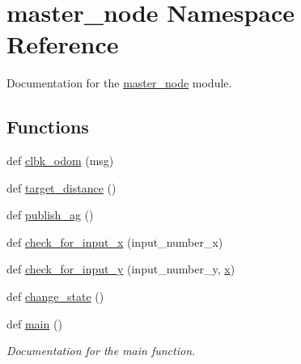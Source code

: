 \hypertarget{namespacemaster__node}{}\section{master\+\_\+node Namespace Reference}
\label{namespacemaster__node}


Documentation for the \hyperlink{namespacemaster__node}{master\+\_\+node} module.  


\subsection*{Functions}
\begin{DoxyCompactItemize}
\item 
def \hyperlink{namespacemaster__node_a5b919927efce47b56b923447a6da9fab}{clbk\+\_\+odom} (msg)
\item 
def \hyperlink{namespacemaster__node_a3488ca68ed6c44dc10a924d5cc2c8bb8}{target\+\_\+distance} ()
\item 
def \hyperlink{namespacemaster__node_a9494767e20dc61a10e137256d2b67fe9}{publish\+\_\+ag} ()
\item 
def \hyperlink{namespacemaster__node_a4fd98279c67cc84ca77711ee2941d683}{check\+\_\+for\+\_\+input\+\_\+x} (input\+\_\+number\+\_\+x)
\item 
def \hyperlink{namespacemaster__node_a4258710deedf0cd5532deab6761cbaa2}{check\+\_\+for\+\_\+input\+\_\+y} (input\+\_\+number\+\_\+y, \hyperlink{namespacemaster__node_a9ea1782ac4a7c8c92e8555fa503ac755}{x})
\item 
def \hyperlink{namespacemaster__node_a5bfa19ba31fffb842b2a34586ca8afff}{change\+\_\+state} ()
\item 
def \hyperlink{namespacemaster__node_a2ca55226f7fa9d0a646050f441478702}{main} ()
\begin{DoxyCompactList}\small\item\em Documentation for the main function. \end{DoxyCompactList}\end{DoxyCompactItemize}
